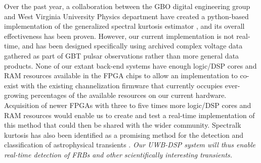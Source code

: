 \documentclass[10pt]{myNSF}
\begin{document}
Over the past year, a collaboration between the GBO digital
engineering group and West Virginia University Physics department have
created a python-based implementation of the generalized spectral
kurtosis estimator \citep{ng10}, and its overall effectiveness has
been proven. However, our current implementation is not real-time, and
has been designed specifically using archived complex voltage data
gathered as part of GBT pulsar observations rather than more general
data products.  None of our extant back-end systems have enough
logic/DSP cores and RAM resources available in the FPGA chips to allow
an implementation to co-exist with the existing channelization
firmware that currently occupies ever-growing percentages of the
available resources on our current hardware. Acquisition of newer
FPGAs with three to five times more logic/DSP cores and RAM resources
would enable us to create and test a real-time implementation of this
method that could then be shared with the wider community.
Spectralk kurtosis has also been identified as a promising method for
the detection and classification of astrophysical transients
\cite{nhmg16}.  \emph{Our UWB-DSP system will thus enable real-time
  detection of FRBs and other scientifically interesting transients.}
\end{document}
